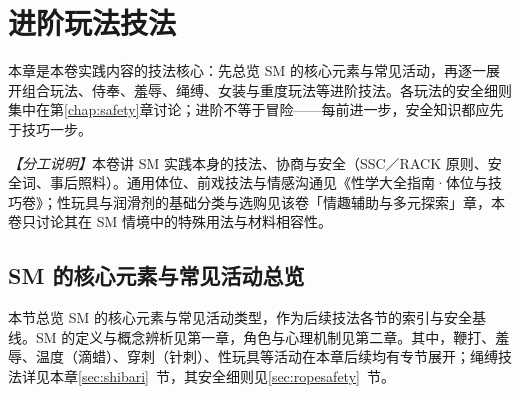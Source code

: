 \documentclass[12pt,UTF8]{ctexbook}
\begin{document}
\chapter{进阶玩法技法}

本章是本卷实践内容的技法核心：先总览 SM 的核心元素与常见活动，再逐一展开组合玩法、侍奉、羞辱、绳缚、女装与重度玩法等进阶技法。各玩法的安全细则集中在第\ref{chap:safety}章讨论；进阶不等于冒险——每前进一步，安全知识都应先于技巧一步。

\noindent\textit{【分工说明】}本卷讲 SM 实践本身的技法、协商与安全（SSC／RACK 原则、安全词、事后照料）。通用体位、前戏技法与情感沟通见《性学大全指南·体位与技巧卷》；性玩具与润滑剂的基础分类与选购见该卷「情趣辅助与多元探索」章，本卷只讨论其在 SM 情境中的特殊用法与材料相容性。


\section{SM 的核心元素与常见活动总览}

本节总览 SM 的核心元素与常见活动类型，作为后续技法各节的索引与安全基线。SM 的定义与概念辨析见第一章，角色与心理机制见第二章。其中，鞭打、羞辱、温度（滴蜡）、穿刺（针刺）、性玩具等活动在本章后续均有专节展开；绳缚技法详见本章\ref{sec:shibari}~节，其安全细则见\ref{sec:ropesafety}~节。
\end{document}
